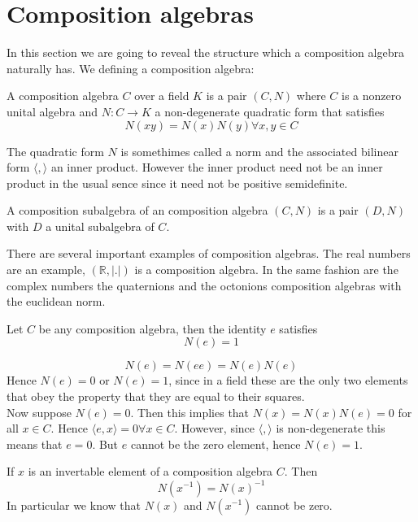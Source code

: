 \documentclass[../Thesis.tex]{subfiles}
\begin{document}
\section{Composition algebras}
In this section we are going to reveal the structure which a composition algebra naturally has. We defining a composition algebra:
\begin{mydef}
A composition algebra $C$ over a field $K$ is a pair $(C, N)$ where $C$ is a nonzero unital algebra and $N : C \rightarrow K$ a non-degenerate quadratic form that satisfies 
\begin{equation}
N(xy) = N(x)N(y) \forall x, y \in C
\end{equation}
\end{mydef}
The quadratic form $N$ is somethimes called a norm and the associated bilinear form $\langle , \rangle$ an inner product. However the inner product need not be an inner product in the usual sence since it need not be positive semidefinite.
\begin{mydef}
A composition subalgebra of an composition algebra $(C, N)$ is a pair $(D, N)$ with $D$ a unital subalgebra of $C$.
\end{mydef}
There are several important examples of composition algebras. The real numbers are an example, $(\mathbb{R}, |.|)$ is a composition algebra. In the same fashion are the complex numbers the quaternions and the octonions composition algebras with the euclidean norm.
\begin{prop}
Let $C$ be any composition algebra, then the identity $e$ satisfies
\begin{equation}
N(e) = 1
\end{equation}
\end{prop}
\begin{myproof}
\begin{equation}
N(e) = N(ee) = N(e)N(e)
\end{equation}
Hence $N(e) = 0$ or $N(e) = 1$, since in a field these are the only two elements that obey the property that they are equal to their squares.
\\Now suppose $N(e) = 0$. Then this implies that $N(x) = N(x)N(e) = 0$ for all $x \in C$. Hence $\langle  e, x \rangle = 0 \forall x \in C$. However, since $\langle , \rangle$ is non-degenerate this means that $ e = 0$. But $e$ cannot be the zero element, hence $N(e) = 1$.
\end{myproof}
\begin{prop}
If $x$ is an invertable element of a composition algebra $C$. Then
\begin{equation}
N(x^{-1}) = N(x)^{-1}
\end{equation}
In particular we know that $N(x)$ and $N(x^{-1})$ cannot be zero.
\end{prop}
\end{document}
